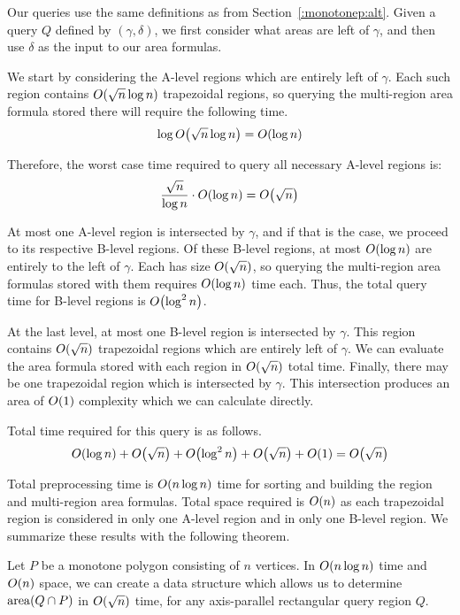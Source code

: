 Our queries use the same definitions as from Section~\ref{:monotonep:alt}. 
Given a query $Q$ defined by $(\gamma, \delta)$, we first consider what areas are left of $\gamma$, and then use $\delta$ as the input to our area formulas.

We start by considering the A-level regions which are entirely left of $\gamma$. 
Each such region contains $O\!\left(\sqrt{n}\log{n}\right)$ trapezoidal regions, so querying the multi-region area formula stored there will require the following time.
\[
\log{O\!\left(\sqrt{n}\log{n}\right)} = O\!\left(\log{n}\right)
\]

\noindent Therefore, the worst case time required to query all necessary A-level regions is:
\[
\frac{\sqrt{n}}{\log{n}} \cdot O\!\left(\log{n}\right) = O\!\left(\sqrt{n}\right)
\]

\noindent At most one A-level region is intersected by $\gamma$, and if that is the case, we proceed to its respective B-level regions.
Of these B-level regions, at most $O\!\left(\log{n}\right)$ are entirely to the left of $\gamma$.
Each has size $O\!\left(\sqrt{n}\right)$, so querying the multi-region area formulas stored with them requires $O\!\left(\log{n}\right)$ time each. Thus, the total query time for B-level regions is $O\!\left(\log^2{n}\right)$.

At the last level, at most one B-level region is intersected by $\gamma$. 
This region contains $O\!\left(\sqrt{n}\right)$ trapezoidal regions which are entirely left of $\gamma$.
We can evaluate the area formula stored with each region in $O\!\left(\sqrt{n}\right)$ total time.
Finally, there may be one trapezoidal region which is intersected by $\gamma$.
This intersection produces an area of $O\!\left(1\right)$ complexity which we can calculate directly.

Total time required for this query is as follows.
\[
O\!\left(\log{n}\right) + O\!\left(\sqrt{n}\right) + O\!\left(\log^2{n}\right) + O\!\left(\sqrt{n}\right) + O\!\left(1\right) = O\!\left(\sqrt{n}\right)
\]

\noindent Total preprocessing time is $O\!\left(n \log{n}\right)$ time for sorting and building the region and multi-region area formulas.  
Total space required is $O\!\left(n\right)$ as each trapezoidal region is considered in only one A-level region and in only one B-level region. 
We summarize these results with the following theorem.

\begin{theorem}
\label{th:mono2}
Let $P$ be a monotone polygon consisting of $n$ vertices. 
In $O\!\left(n \log{n}\right)$ time and $O\!\left(n\right)$ space, we can create a data structure which allows us to determine $\operatorname{area}\!\left(Q \cap P\right)$ in $O\!\left(\sqrt{n}\right)$ time, for any axis-parallel rectangular query region $Q$.
\end{theorem}



